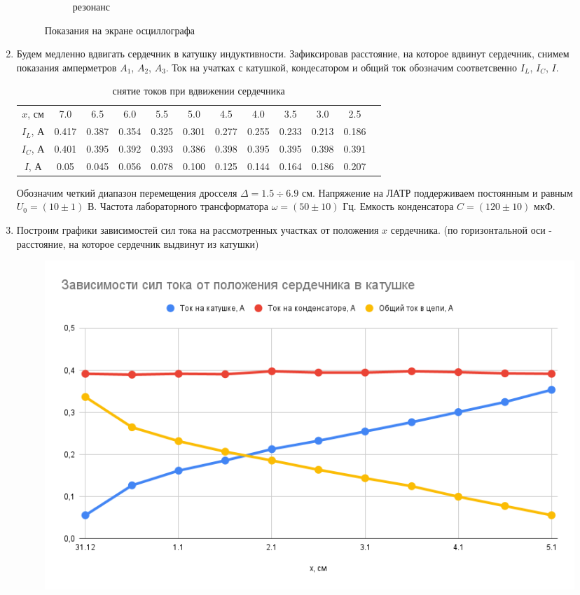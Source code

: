 \documentclass[a4paper, 12pt]{article}
\begin{document}
\begin{enumerate}
\begin{figure}[htbp]
\begin{subfigure}{0.3\textwidth}
            \caption{резонанс}
            \label{resonanse}
        \end{subfigure}
        \caption{Показания на экране осциллографа}
        \label{fig:figures}
    \end{figure}
    \item Будем медленно вдвигать сердечник в катушку индуктивности. Зафиксировав расстояние, на которое вдвинут сердечник, снимем показания
    амперметров $A_{1}$, $A_{2}$, $A_{3}$. Ток на учатках с катушкой, кондесатором и общий ток обозначим соответсвенно $I_{L}$, $I_{C}$, $I$.
    \begin{table}[htbp]
        \centering
        \begin{tabular}{|c|c|c|c|c|c|c|c|c|c|c|c|}
            \hline
            $x$, см & 7.0 & 6.5 & 6.0 & 5.5 & 5.0 & 4.5 & 4.0 & 3.5 & 3.0 & 2.5 \\
            $I_{L}$, А & 0.417 & 0.387 & 0.354 & 0.325 & 0.301 & 0.277 & 0.255 & 0.233 & 0.213 & 0.186 \\
            $I_{C}$, А & 0.401 & 0.395 & 0.392 & 0.393 & 0.386 & 0.398 & 0.395 & 0.395 & 0.398 & 0.391 \\
            $I$, А & 0.05 & 0.045 & 0.056 & 0.078 & 0.100 & 0.125 & 0.144 & 0.164 & 0.186 & 0.207 \\
            \hline
        \end{tabular}
        \caption{снятие токов при вдвижении сердечника}
        \label{снятие токов при вдвижении сердечника}
    \end{table}\newline
    Обозначим четкий диапазон перемещения дросселя $\Delta = 1.5 \div 6.9$ см.
    Напряжение на ЛАТР поддерживаем постоянным и равным $U_{0} = (10 \pm 1)$ В.
    Частота лабораторного трансформатора $\omega = (50\pm 10)$ Гц.
    Емкость конденсатора $C = (120\pm 10)$ мкФ.
    \newpage
    \item Построим графики зависимостей сил тока на рассмотренных участках от положения $x$ сердечника.
    (по горизонтальной оси - расстояние, на которое сердечник выдвинут из катушки)
    \begin{figure}[htbp]
        \centering
        \includegraphics[width=0.6\linewidth]{I_x.png}

\end{figure}
\end{enumerate}
\end{document}

